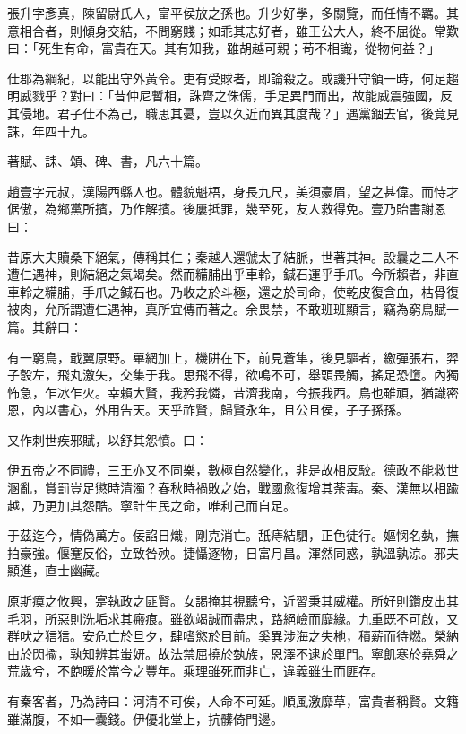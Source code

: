 
\begin{pinyinscope}
張升字彥真，陳留尉氏人，富平侯放之孫也。升少好學，多關覽，而任情不羈。其意相合者，則傾身交結，不問窮賤；如乖其志好者，雖王公大人，終不屈從。常歎曰：「死生有命，富貴在天。其有知我，雖胡越可親；苟不相識，從物何益？」

仕郡為綱紀，以能出守外黃令。吏有受賕者，即論殺之。或譏升守領一時，何足趨明威戮乎？對曰：「昔仲尼暫相，誅齊之侏儒，手足異門而出，故能威震強國，反其侵地。君子仕不為己，職思其憂，豈以久近而異其度哉？」遇黨錮去官，後竟見誅，年四十九。

著賦、誄、頌、碑、書，凡六十篇。

趙壹字元叔，漢陽西縣人也。體貌魁梧，身長九尺，美須豪眉，望之甚偉。而恃才倨傲，為鄉黨所擯，乃作解擯。後屢抵罪，幾至死，友人救得免。壹乃貽書謝恩曰：

昔原大夫贖桑下絕氣，傳稱其仁；秦越人還虢太子結脈，世著其神。設曩之二人不遭仁遇神，則結絕之氣竭矣。然而糒脯出乎車軨，鍼石運乎手爪。今所賴者，非直車軨之糒脯，手爪之鍼石也。乃收之於斗極，還之於司命，使乾皮復含血，枯骨復被肉，允所謂遭仁遇神，真所宜傳而著之。余畏禁，不敢班班顯言，竊為窮鳥賦一篇。其辭曰：

有一窮鳥，戢翼原野。罼網加上，機阱在下，前見蒼隼，後見驅者，繳彈張右，羿子彀左，飛丸激矢，交集于我。思飛不得，欲鳴不可，舉頭畏觸，搖足恐墯。內獨怖急，乍冰乍火。幸賴大賢，我矜我憐，昔濟我南，今振我西。鳥也雖頑，猶識密恩，內以書心，外用告天。天乎祚賢，歸賢永年，且公且侯，子子孫孫。

又作刺世疾邪賦，以舒其怨憤。曰：

伊五帝之不同禮，三王亦又不同樂，數極自然變化，非是故相反駮。德政不能救世溷亂，賞罰豈足懲時清濁？春秋時禍敗之始，戰國愈復增其荼毒。秦、漢無以相踰越，乃更加其怨酷。寧計生民之命，唯利己而自足。

于茲迄今，情偽萬方。佞諂日熾，剛克消亡。舐痔結駟，正色徒行。嫗悯名埶，撫拍豪強。偃蹇反俗，立致咎殃。捷懾逐物，日富月昌。渾然同惑，孰溫孰涼。邪夫顯進，直士幽藏。

原斯瘼之攸興，寔執政之匪賢。女謁掩其視聽兮，近習秉其威權。所好則鑽皮出其毛羽，所惡則洗垢求其瘢痕。雖欲竭誠而盡忠，路絕嶮而靡緣。九重既不可啟，又群吠之狺狺。安危亡於旦夕，肆嗜慾於目前。奚異涉海之失杝，積薪而待燃。榮納由於閃揄，孰知辨其蚩妍。故法禁屈撓於埶族，恩澤不逮於單門。寧飢寒於堯舜之荒歲兮，不飽暖於當今之豐年。乘理雖死而非亡，違義雖生而匪存。

有秦客者，乃為詩曰：河清不可俟，人命不可延。順風激靡草，富貴者稱賢。文籍雖滿腹，不如一囊錢。伊優北堂上，抗髒倚門邊。


\end{pinyinscope}
